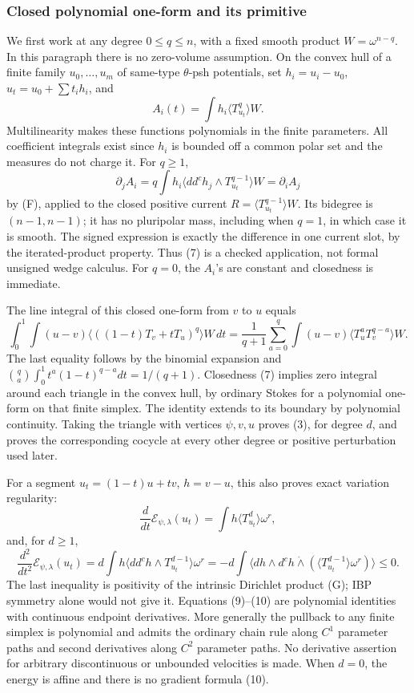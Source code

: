 \documentclass[
  11pt,
]{article}
\begin{document}
\subsubsection{Closed polynomial one-form and its
primitive}\label{closed-polynomial-one-form-and-its-primitive}

We first work at any degree \(0\leq q\leq n\), with a fixed smooth
product \(W=\omega^{n-q}\). In this paragraph there is no zero-volume
assumption. On the convex hull of a finite family \(u_0,\ldots,u_m\) of
same-type \(\theta\)-psh potentials, set \(h_i=u_i-u_0\),
\(u_t=u_0+\sum t_i h_i\), and \[
A_i(t)=\int h_i\langle T_{u_t}^q\rangle W.
\] Multilinearity makes these functions polynomials in the finite
parameters. All coefficient integrals exist since \(h_i\) is bounded off
a common polar set and the measures do not charge it. For \(q\geq1\), \[
\partial_j A_i=q\int h_i\langle dd^ch_j\wedge T_{u_t}^{q-1}\rangle W
=\partial_i A_j
\tag{7}
\] by (F), applied to the closed positive current
\(R=\langle T_{u_t}^{q-1}\rangle W\). Its bidegree is \((n-1,n-1)\); it
has no pluripolar mass, including when \(q=1\), in which case it is
smooth. The signed expression is exactly the difference in one current
slot, by the iterated-product property. Thus (7) is a checked
application, not formal unsigned wedge calculus. For \(q=0\), the
\(A_i\)'s are constant and closedness is immediate.

The line integral of this closed one-form from \(v\) to \(u\) equals \[
\int_0^1\int (u-v)\langle((1-t)T_v+tT_u)^q\rangle W\,dt
=\frac1{q+1}\sum_{a=0}^q\int(u-v)\langle T_u^aT_v^{q-a}\rangle W.
\tag{8}
\] The last equality follows by the binomial expansion and
\(\binom qa\int_0^1t^a(1-t)^{q-a}dt=1/(q+1)\). Closedness (7) implies
zero integral around each triangle in the convex hull, by ordinary
Stokes for a polynomial one-form on that finite simplex. The identity
extends to its boundary by polynomial continuity. Taking the triangle
with vertices \(\psi,v,u\) proves (3), for degree \(d\), and proves the
corresponding cocycle at every other degree or positive perturbation
used later.

For a segment \(u_t=(1-t)u+tv\), \(h=v-u\), this also proves exact
variation regularity: \[
\frac d{dt}\mathcal E_{\psi,\lambda}(u_t)=\int h\langle T_{u_t}^d\rangle\omega^r,
\tag{9}
\] and, for \(d\geq1\), \[
\frac {d^2}{dt^2}\mathcal E_{\psi,\lambda}(u_t)
=d\int h\langle dd^ch\wedge T_{u_t}^{d-1}\rangle\omega^r
=-d\int\langle dh\wedge d^ch\dot\wedge
(\langle T_{u_t}^{d-1}\rangle\omega^r)\rangle\leq0.
\tag{10}
\] The last inequality is positivity of the intrinsic Dirichlet product
(G); IBP symmetry alone would not give it. Equations (9)--(10) are
polynomial identities with continuous endpoint derivatives. More
generally the pullback to any finite simplex is polynomial and admits
the ordinary chain rule along \(C^1\) parameter paths and second
derivatives along \(C^2\) parameter paths. No derivative assertion for
arbitrary discontinuous or unbounded velocities is made. When \(d=0\),
the energy is affine and there is no gradient formula (10).
\end{document}
